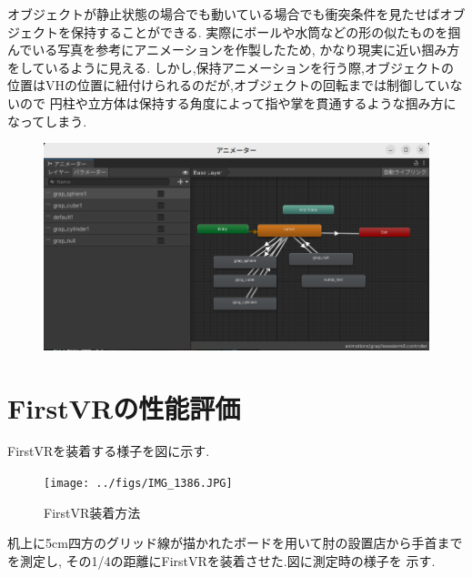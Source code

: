 \documentclass{ltjsreport}
\begin{document}
		オブジェクトが静止状態の場合でも動いている場合でも衝突条件を見たせばオブジェクトを保持することができる.
		実際にボールや水筒などの形の似たものを掴んでいる写真を参考にアニメーションを作製したため,
		かなり現実に近い掴み方をしているように見える.
		しかし,保持アニメーションを行う際,オブジェクトの位置はVHの位置に紐付けられるのだが,オブジェクトの回転までは制御していないので
		円柱や立方体は保持する角度によって指や掌を貫通するような掴み方になってしまう.

		\begin{figure}[H]
		\centering
		\includegraphics[width = 12cm]{../figs/Handanimater.png}
		\caption{}
		\label{}
		\end{figure}

	\section{FirstVRの性能評価}
		FirstVRを装着する様子を図に示す.
		\begin{figure}[H]
		\centering
		\texttt{[image: ../figs/IMG\_1386.JPG]}
		\caption{FirstVR装着方法}
		\label{fig:FirsrVRfit}
		\end{figure}
		机上に5cm四方のグリッド線が描かれたボードを用いて肘の設置店から手首までを測定し,
		その1/4の距離にFirstVRを装着させた.図に測定時の様子を
		示す.
\end{document}
